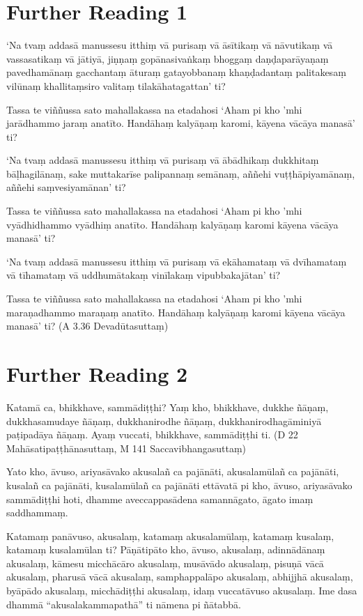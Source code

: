 \section*{Further Reading 1}

‘Na tvaṃ addasā manussesu itthiṃ vā purisaṃ vā āsītikaṃ vā nāvutikaṃ vā vassasatikaṃ vā jātiyā, jiṇṇaṃ gopānasivaṅkaṃ bhoggaṃ daṇḍaparāyaṇaṃ pavedhamānaṃ gacchantaṃ āturaṃ gatayobbanaṃ khaṇḍadantaṃ palitakesaṃ vilūnaṃ khallitaṃsiro valitaṃ tilakāhatagattan’ ti?

Tassa te viññussa sato mahallakassa na etadahosi ‘Aham pi kho ’mhi jarādhammo jaraṃ anatīto. Handāhaṃ kalyāṇaṃ karomi, kāyena vācāya manasā’ ti?

‘Na tvaṃ addasā manussesu itthiṃ vā purisaṃ vā ābādhikaṃ dukkhitaṃ bāḷhagilānaṃ, sake muttakarīse palipannaṃ semānaṃ, aññehi vuṭṭhāpiyamānaṃ, aññehi saṃvesiyamānan’ ti?

Tassa te viññussa sato mahallakassa na etadahosi ‘Aham pi kho ’mhi vyādhidhammo vyādhiṃ anatīto. Handāhaṃ kalyāṇaṃ karomi kāyena vācāya manasā’ ti?

‘Na tvaṃ addasā manussesu itthiṃ vā purisaṃ vā ekāhamataṃ vā dvīhamataṃ vā tīhamataṃ vā uddhumātakaṃ vinīlakaṃ vipubbakajātan’ ti?

Tassa te viññussa sato mahallakassa na etadahosi ‘Aham pi kho ’mhi maraṇadhammo maraṇaṃ anatīto. Handāhaṃ kalyāṇaṃ karomi kāyena vācāya manasā’ ti? (A 3.36 Devadūtasuttaṃ)

\section*{Further Reading 2}

Katamā ca, bhikkhave, sammādiṭṭhi? Yaṃ kho, bhikkhave, dukkhe ñāṇaṃ, dukkhasamudaye ñāṇaṃ, dukkhanirodhe ñāṇaṃ, dukkhanirodhagāminiyā paṭipadāya ñāṇaṃ. Ayaṃ vuccati, bhikkhave, sammādiṭṭhi ti. (D 22 Mahāsatipaṭṭhānasuttaṃ, M 141 Saccavibhangasuttaṃ)

Yato kho, āvuso, ariyasāvako akusalañ ca pajānāti, akusalamūlañ ca pajānāti, kusalañ ca pajānāti, kusalamūlañ ca pajānāti ettāvatā pi kho, āvuso, ariyasāvako sammādiṭṭhi hoti, dhamme aveccappasādena samannāgato, āgato imaṃ saddhammaṃ.

Katamaṃ panāvuso, akusalaṃ, katamaṃ akusalamūlaṃ, katamaṃ kusalaṃ, katamaṃ kusalamūlan ti? Pāṇātipāto kho, āvuso, akusalaṃ, adinnādānaṃ akusalaṃ, kāmesu micchācāro akusalaṃ, musāvādo akusalaṃ, pisuṇā vācā akusalaṃ, pharusā vācā akusalaṃ, samphappalāpo akusalaṃ, abhijjhā akusalaṃ, byāpādo akusalaṃ, micchādiṭṭhi akusalaṃ, idaṃ vuccatāvuso akusalaṃ. Ime dasa dhammā “akusalakammapathā” ti nāmena pi ñātabbā.

